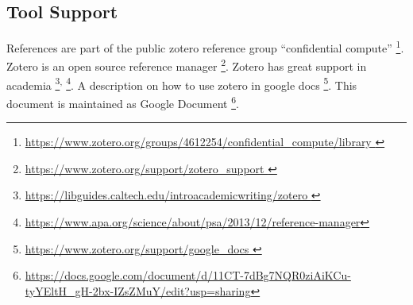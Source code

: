 \subsection*{Tool Support}

References are part of the public zotero reference group  “confidential compute”
\footnote{\url{https://www.zotero.org/groups/4612254/confidential_compute/library }}.
Zotero is an open source reference manager
\footnote{\url{https://www.zotero.org/support/zotero_support }}.
Zotero has great support in academia
\footnote{\url{https://libguides.caltech.edu/introacademicwriting/zotero }}\textsuperscript{,}
\footnote{\url{https://www.apa.org/science/about/psa/2013/12/reference-manager}}.
A description on how to use zotero in google docs 
\footnote{\url{https://www.zotero.org/support/google_docs }}.
This document is maintained as Google Document
\footnote{\url{https://docs.google.com/document/d/11CT-7dBg7NQR0ziAiKCu-tyYEltH_gH-2bx-IZsZMuY/edit?usp=sharing}}.



